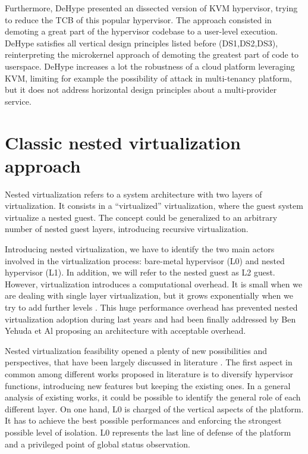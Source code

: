 \documentclass{sig-alternate}
\begin{document}
Furthermore, DeHype \cite{wu2013TamHosHypMosDepExe} presented an dissected version of KVM hypervisor, trying to reduce the TCB of this popular hypervisor. The approach consisted in demoting a great part of the hypervisor codebase to a user-level execution. DeHype satisfies all vertical design principles listed before (DS1,DS2,DS3), reinterpreting the microkernel approach of  demoting the greatest part of code to userspace. DeHype increases a lot the robustness of a cloud platform leveraging KVM, limiting for example the possibility of attack in multi-tenancy platform, but it does not address horizontal design principles about a multi-provider service.

\section{Classic nested virtualization approach}

Nested virtualization refers to a system architecture with two layers of virtualization. It consists in a ``virtualized'' virtualization, where the guest system virtualize a nested guest. The concept could be generalized to an arbitrary number of nested guest layers, introducing recursive virtualization.

Introducing nested virtualization, we have to identify the two main actors involved in the virtualization process: bare-metal hypervisor (L0) and nested hypervisor (L1). In addition, we will refer to the nested guest as L2 guest. 
However, virtualization introduces a computational overhead. It is small when we are dealing with single layer virtualization, but it grows exponentially when we try to add further levels \cite{rec:virt}. This huge performance overhead has prevented nested virtualization adoption during last years and had been finally addressed by Ben Yehuda et Al \cite{turtles:ibm} proposing an architecture with acceptable overhead.

Nested virtualization feasibility opened a plenty of new possibilities and perspectives, that have been largely discussed in literature \cite{rec:virt,turtles:ibm,art:blan}. The first aspect in common among different works proposed in literature is to diversify hypervisor functions, introducing new features but keeping the existing ones. In a general analysis of existing works, it could be possible to identify the general role of each different layer.
On one hand, L0 is charged of the vertical aspects of the platform. It has to achieve  the best possible performances and enforcing the strongest possible level of isolation. L0 represents the last line of defense of the platform and a privileged point of global status observation.
\end{document}
